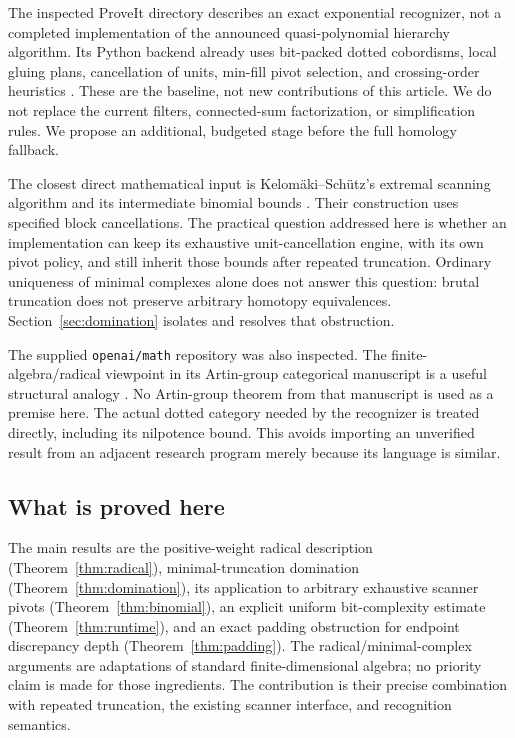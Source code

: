 \documentclass[11pt]{article}
\theoremstyle{definition}\newtheorem{definition}[theorem]{Definition}
\theoremstyle{remark}\newtheorem{remark}[theorem]{Remark}
\begin{document}
The inspected ProveIt directory describes an exact exponential recognizer, not a completed implementation of the announced quasi-polynomial hierarchy algorithm. Its Python backend already uses bit-packed dotted cobordisms, local gluing plans, cancellation of units, min-fill pivot selection, and crossing-order heuristics \cite{ProveIt}. These are the baseline, not new contributions of this article. We do not replace the current filters, connected-sum factorization, or simplification rules. We propose an additional, budgeted stage before the full homology fallback.

The closest direct mathematical input is Kelom\"aki--Sch\"utz's extremal scanning algorithm and its intermediate binomial bounds \cite[Lemma 5.5]{KS}. Their construction uses specified block cancellations. The practical question addressed here is whether an implementation can keep its exhaustive unit-cancellation engine, with its own pivot policy, and still inherit those bounds after repeated truncation. Ordinary uniqueness of minimal complexes alone does not answer this question: brutal truncation does not preserve arbitrary homotopy equivalences. Section~\ref{sec:domination} isolates and resolves that obstruction.

The supplied \texttt{openai/math} repository was also inspected. The finite-algebra/radical viewpoint in its Artin-group categorical manuscript is a useful structural analogy \cite{OpenAICategory}. No Artin-group theorem from that manuscript is used as a premise here. The actual dotted category needed by the recognizer is treated directly, including its nilpotence bound. This avoids importing an unverified result from an adjacent research program merely because its language is similar.

\subsection{What is proved here}
The main results are the positive-weight radical description (Theorem~\ref{thm:radical}), minimal-truncation domination (Theorem~\ref{thm:domination}), its application to arbitrary exhaustive scanner pivots (Theorem~\ref{thm:binomial}), an explicit uniform bit-complexity estimate (Theorem~\ref{thm:runtime}), and an exact padding obstruction for endpoint discrepancy depth (Theorem~\ref{thm:padding}). The radical/minimal-complex arguments are adaptations of standard finite-dimensional algebra; no priority claim is made for those ingredients. The contribution is their precise combination with repeated truncation, the existing scanner interface, and recognition semantics.
\end{document}

